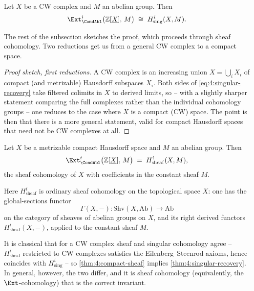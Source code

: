 \begin{theorem}
\label{thm:4:singular-recovery}
Let $X$ be a CW complex and $M$ an abelian group. Then
\begin{equation}
\label{eq:4:singular-recovery}
\Ext^{i}_{\CondAbl}\bigl(\mathbb{Z}[\underline{X}],\,M\bigr)
\;\cong\;
H^{i}_{\mathrm{sing}}(X,M).
\end{equation}
\end{theorem}

The rest of the subsection sketches the proof, which proceeds through sheaf
cohomology. Two reductions get us from a general CW complex to a compact space.

\begin{proof}[Proof sketch, first reductions]
A CW complex is an increasing union $X=\bigcup_i X_i$ of compact (and metrizable)
Hausdorff subspaces $X_i$. Both sides of \eqref{eq:4:singular-recovery} take
filtered colimits in $X$ to derived limits, so -- with a slightly sharper
statement comparing the full complexes rather than the individual cohomology
groups -- one reduces to the case where $X$ is a compact (CW) space. The point
is then that there is a more general statement, valid for compact Hausdorff
spaces that need not be CW complexes at all.
\end{proof}

\begin{theorem}
\label{thm:4:compact-sheaf}
Let $X$ be a metrizable compact Hausdorff space and $M$ an abelian group. Then
\begin{equation*}
\Ext^{i}_{\CondAbl}\bigl(\mathbb{Z}[\underline{X}],\,M\bigr)
\;=\;
H^{i}_{\mathrm{sheaf}}(X,M),
\end{equation*}
the sheaf cohomology of $X$ with coefficients in the constant sheaf $M$.
\end{theorem}

Here $H^i_{\mathrm{sheaf}}$ is ordinary sheaf cohomology on the topological space
$X$: one has the global-sections functor
\begin{equation*}
\Gamma(X,-)\colon \mathrm{Shv}(X,\mathrm{Ab})\longrightarrow\mathrm{Ab}
\end{equation*}
on the category of sheaves of abelian groups on $X$, and its right derived
functors $H^i_{\mathrm{sheaf}}(X,-)$, applied to the constant sheaf $M$.

It is classical that for a CW complex sheaf and singular cohomology agree --
$H^i_{\mathrm{sheaf}}$ restricted to CW complexes satisfies the
Eilenberg--Steenrod axioms, hence coincides with $H^i_{\mathrm{sing}}$ -- so
\cref{thm:4:compact-sheaf} implies \cref{thm:4:singular-recovery}. In general,
however, the two differ, and it is sheaf cohomology (equivalently, the
$\Ext$-cohomology) that is the correct invariant.

